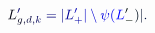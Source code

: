\documentclass[12pt]{article}
\begin{document}
\makeatletter
\renewcommand*{\@textcolor}[3]{%
  \protect\leavevmode
  \begingroup
    \color#1{#2}#3%
  \endgroup
}
\makeatother
\begin{displaymath}
\mathcolor[RGB]{0,0,15}{L} _ { \mathcolor[RGB]{0,0,30}{g} \mathcolor[RGB]{0,0,45}{,} \mathcolor[RGB]{0,0,60}{d} \mathcolor[RGB]{0,0,75}{,} \mathcolor[RGB]{0,0,90}{k} } ^ { \mathcolor[RGB]{0,0,105}{\prime} } \mathcolor[RGB]{0,0,120}{=} \mathcolor[RGB]{0,0,135}{|} \mathcolor[RGB]{0,0,150}{L} _ { \mathcolor[RGB]{0,0,165}{+} } ^ { \mathcolor[RGB]{0,0,180}{\prime} } \mathcolor[RGB]{0,0,195}{|} \mathcolor[RGB]{0,0,210}{\setminus} \mathcolor[RGB]{0,0,225}{\psi} \mathcolor[RGB]{0,0,240}{(} \mathcolor[RGB]{0,0,255}{L} _ { \mathcolor[RGB]{0,15,0}{-} } ^ { \mathcolor[RGB]{0,15,15}{\prime} } \mathcolor[RGB]{0,15,30}{)} \mathcolor[RGB]{0,15,45}{|} \mathcolor[RGB]{0,15,60}{.}
\end{displaymath}
\end{document}

